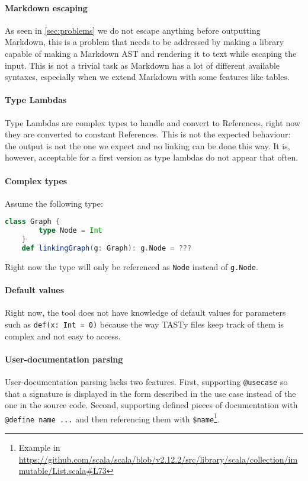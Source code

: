 \documentclass{report}
\begin{document}
\paragraph{Markdown escaping}
As seen in \autoref{sec:problems} we do not escape anything before outputting Markdown, this is a problem that needs to be addressed by making a library capable of making a Markdown AST and rendering it to text while escaping the input. This is not a trivial task as Markdown has a lot of different available syntaxes, especially when we extend Markdown with some features like tables.

\paragraph{Type Lambdas}
Type Lambdas are complex types to handle and convert to References, right now they are converted to constant References. This is not the expected behaviour: the output is not the one we expect and no linking can be done this way. It is, however, acceptable for a first version as type lambdas do not appear that often.

\paragraph{Complex types}
Assume the following type:
\begin{lstlisting}[language=scala]
    class Graph {
        type Node = Int
    }
    def linkingGraph(g: Graph): g.Node = ???    
\end{lstlisting}
Right now the type will only be referenced as \texttt{Node} instead of \texttt{g.Node}.

\paragraph{Default values}
Right now, the tool does not have knowledge of default values for parameters such as \texttt{def(x: Int = 0)} because the way TASTy files keep track of them is complex and not easy to access.

\paragraph{User-documentation parsing}
User-documentation parsing lacks two features. First, supporting \texttt{@usecase} so that a signature is displayed in the form described in the use case instead of the one in the source code. Second, supporting defined pieces of documentation with \texttt{@define name ...} and then referencing them with \texttt{\$name}\footnote{Example in \url{https://github.com/scala/scala/blob/v2.12.2/src/library/scala/collection/immutable/List.scala\#L73}}.
\end{document}
